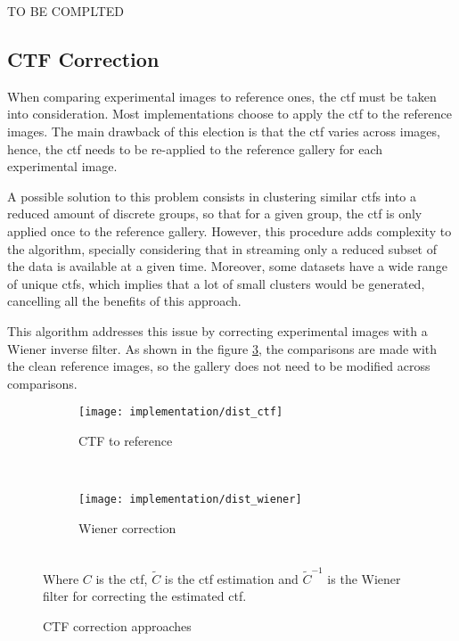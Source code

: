 \documentclass[../main.tex]{subfiles}
\begin{document}
TO BE COMPLTED

\subsection{CTF Correction}
When comparing experimental images to reference ones, the \gls{ctf} must be taken into consideration. Most implementations choose to apply the \gls{ctf} to the reference images. The main drawback of this election is that the \gls{ctf} varies across images, hence, the \gls{ctf} needs to be re-applied to the reference gallery for each experimental image\cite{scheres2005}.

A possible solution to this problem consists in clustering similar \glspl{ctf} into a reduced amount of discrete groups, so that for a given group, the \gls{ctf} is only applied once to the reference gallery. However, this procedure adds complexity to the algorithm, specially considering that in streaming only a reduced subset of the data is available at a given time. Moreover, some datasets have a wide range of unique \glspl{ctf}, which implies that a lot of small clusters would be generated, cancelling all the benefits of this approach.

This algorithm addresses this issue by correcting experimental images with a Wiener inverse filter. As shown in the figure \ref{fig:4:wiener}, the comparisons are made with the clean reference images, so the gallery does not need to be modified across comparisons.

\begin{figure}[htbp]
    \centering
    \begin{subfigure}[b]{\textwidth}
         \centering
         \texttt{[image: implementation/dist\_ctf]}
         \caption{CTF to reference}
         \label{fig:4:wiener:ctf}
    \end{subfigure}\\
    \vspace{2em}
    \begin{subfigure}[b]{\textwidth}
         \centering
         \texttt{[image: implementation/dist\_wiener]}
         \caption{Wiener correction}
         \label{fig:4:wiener:wiener}
    \end{subfigure}\\
    Where $C$ is the \gls{ctf}, $\tilde{C}$ is the \gls{ctf} estimation and $\tilde{C}^{-1}$ is the Wiener filter for correcting the estimated \gls{ctf}.
    \caption{CTF correction approaches}
    \label{fig:4:wiener}
\end{figure}
\end{document}
